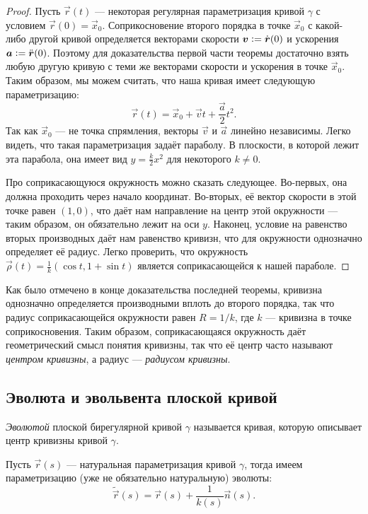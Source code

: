 \begin{proof}
	Пусть $\vec{r}(t)$ --- некоторая регулярная параметризация кривой $\gamma$ с условием $\vec{r}(0) = \vec{x}_0$. Соприкосновение второго порядка в точке $\vec{x}_0$ с какой-либо другой кривой определяется векторами скорости $\vec{v} \vcentcolon = \dot{\vec{r}}(0)$ и ускорения $\vec{a} \vcentcolon = \ddot{\vec{r}}(0)$. Поэтому для доказательства первой части теоремы достаточно взять любую другую кривую с теми же векторами скорости и ускорения в точке $\vec{x}_0$. Таким образом, мы можем считать, что наша кривая имеет следующую параметризацию:
	\[
		\vec{r}(t) = \vec{x}_0 + \vec{v}t + \frac{\vec{a}}{2}t^2.
	\]
	Так как $\vec{x}_0$ --- не точка спрямления, векторы $\vec{v}$ и $\vec{a}$ линейно независимы. Легко видеть, что такая параметризация задаёт параболу. В плоскости, в которой лежит эта парабола, она имеет вид $y = \frac{k}{2}x^2$ для некоторого $k \ne 0$.

	Про соприкасающуюся окружность можно сказать следующее. Во-первых, она должна проходить через начало координат. Во-вторых, её вектор скорости в этой точке равен $(1, 0)$, что даёт нам направление на центр этой окружности --- таким образом, он обязательно лежит на оси $y$. Наконец, условие на равенство вторых производных даёт нам равенство кривизн, что для окружности однозначно определяет её радиус. Легко проверить, что окружность $\vec{\rho}(t) = \frac{1}{k}(\cos t, 1 + \sin t)$ является соприкасающейся к нашей параболе.
\end{proof}

Как было отмечено в конце доказательства последней теоремы, кривизна однозначно определяется производными вплоть до второго порядка, так что радиус соприкасающейся окружности равен $R = 1 / k$, где $k$ --- кривизна в точке соприкосновения. Таким образом, соприкасающаяся окружность даёт геометрический смысл понятия кривизны, так что её центр часто называют \textit{центром кривизны}, а радиус --- \textit{радиусом кривизны}.

\subsection{Эволюта и эвольвента плоской кривой}

\begin{definition}
	\textit{Эволютой} плоской бирегулярной кривой $\gamma$ называется кривая, которую описывает центр кривизны кривой $\gamma$.
\end{definition}

Пусть $\vec{r}(s)$ --- натуральная параметризация кривой $\gamma$, тогда имеем параметризацию (уже не обязательно натуральную) эволюты:
\begin{equation} \label{eq:Evolute}
	\widetilde{\vec{r}}(s) = \vec{r}(s) + \frac{1}{k(s)}\vec{n}(s).
\end{equation}

